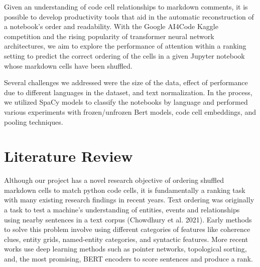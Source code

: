 \documentclass[conference]{IEEEtran}
\begin{document}
Given an understanding of code cell relationships to markdown comments, it is possible to develop productivity tools that aid in the automatic reconstruction of a notebook's order and readability. With the Google AI4Code Kaggle competition and the rising popularity of transformer neural network architectures, we aim to explore the performance of attention within a ranking setting to predict the correct ordering of the cells in a given Jupyter notebook whose markdown cells have been shuffled.

Several challenges we addressed were the size of the data, effect of performance due to different languages in the dataset, and text normalization. In the process, we utilized SpaCy models to classify the notebooks by language and performed various experiments with frozen/unfrozen Bert models, code cell embeddings, and pooling techniques.


\section{Literature Review}
Although our project has a novel research objective of ordering shuffled markdown cells to match python code cells, it is fundamentally a ranking task with many existing research findings in recent years. Text ordering was originally a task to test a machine’s understanding of entities, events and relationships using nearby sentences in a text corpus (Chowdhury et al. 2021). Early methods to solve this problem involve using different categories of features like coherence clues, entity grids, named-entity categories, and syntactic features. More recent works use deep learning methods such as pointer networks, topological sorting, and, the most promising, BERT encoders to score sentences and produce a rank.
\end{document}
